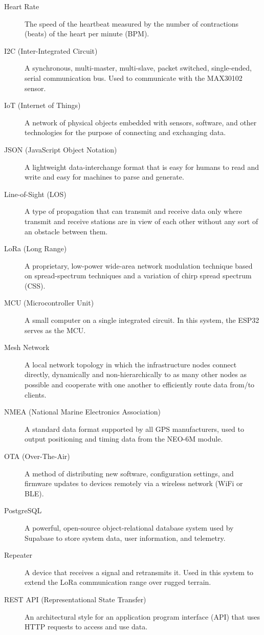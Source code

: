 \begin{description}
\item[Heart Rate] The speed of the heartbeat measured by the number of contractions (beats) of the heart per minute (BPM).
\item[I2C (Inter-Integrated Circuit)] A synchronous, multi-master, multi-slave, packet switched, single-ended, serial communication bus. Used to communicate with the MAX30102 sensor.
\item[IoT (Internet of Things)] A network of physical objects embedded with sensors, software, and other technologies for the purpose of connecting and exchanging data.
\item[JSON (JavaScript Object Notation)] A lightweight data-interchange format that is easy for humans to read and write and easy for machines to parse and generate.
\item[Line-of-Sight (LOS)] A type of propagation that can transmit and receive data only where transmit and receive stations are in view of each other without any sort of an obstacle between them.
\item[LoRa (Long Range)] A proprietary, low-power wide-area network modulation technique based on spread-spectrum techniques and a variation of chirp spread spectrum (CSS).
\item[MCU (Microcontroller Unit)] A small computer on a single integrated circuit. In this system, the ESP32 serves as the MCU.
\item[Mesh Network] A local network topology in which the infrastructure nodes connect directly, dynamically and non-hierarchically to as many other nodes as possible and cooperate with one another to efficiently route data from/to clients.
\item[NMEA (National Marine Electronics Association)] A standard data format supported by all GPS manufacturers, used to output positioning and timing data from the NEO-6M module.
\item[OTA (Over-The-Air)] A method of distributing new software, configuration settings, and firmware updates to devices remotely via a wireless network (WiFi or BLE).
\item[PostgreSQL] A powerful, open-source object-relational database system used by Supabase to store system data, user information, and telemetry.
\item[Repeater] A device that receives a signal and retransmits it. Used in this system to extend the LoRa communication range over rugged terrain.
\item[REST API (Representational State Transfer)] An architectural style for an application program interface (API) that uses HTTP requests to access and use data.

\end{description}

